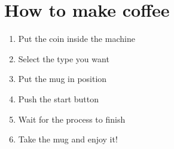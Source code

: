 \documentclass[a4paper]{article}
\begin{document}
  \section{How to make coffee}
    \begin{enumerate}
      \item Put the coin inside the machine
      \item Select the type you want
      \item Put the mug in position
      \item Push the start button
      \item Wait for the process to finish 
      \item Take the mug and enjoy it!
   \end{enumerate}
\end{document}
